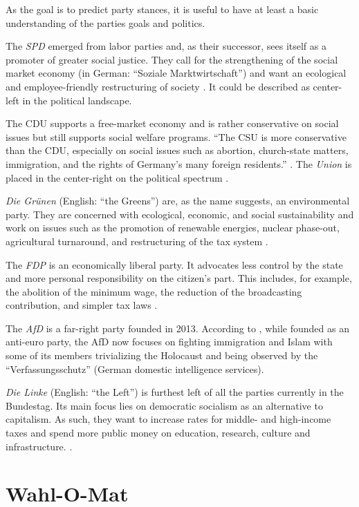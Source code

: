 As the goal is to predict party stances, it is useful to have at least a basic understanding of the parties goals and politics.

The \textit{SPD} emerged from labor parties and, as their successor, sees itself as a promoter of greater social justice. They call for the strengthening of the social market economy (in German: ``Soziale Marktwirtschaft'') and want an ecological and employee-friendly restructuring of society \citep{schubert2016politiklexikon}. It could be described as center-left in the political landscape.

The CDU supports a free-market economy and is rather conservative on social issues but still supports social welfare programs. ``The CSU is more conservative than the CDU, especially on social issues such as abortion, church-state matters, immigration, and the rights of Germany’s many foreign residents.'' \citep{conradt_2013}. The \textit{Union} is placed in the center-right on the political spectrum \citep{conradt_2021}.

\textit{Die Grünen} (English: ``the Greens'') are, as the name suggests, an environmental party. They are concerned with ecological, economic, and social sustainability and work on issues such as the promotion of renewable energies, nuclear phase-out, agricultural turnaround, and restructuring of the tax system \citep{decker_2021}.

The \textit{FDP} is an economically liberal party. It advocates less control by the state and more personal responsibility on the citizen's part. This includes, for example, the abolition of the minimum wage, the reduction of the broadcasting contribution, and simpler tax laws \citep{wiki_fdp}.

The \textit{AfD} is a far-right party founded in 2013. According to \citet{bbc_2020}, while founded as an anti-euro party, the AfD now focuses on fighting immigration and Islam with some of its members trivializing the Holocaust and being observed by the ``Verfassungsschutz'' (German domestic intelligence services).

\textit{Die Linke} (English: ``the Left'') is furthest left of all the parties currently in the Bundestag. Its main focus lies on democratic socialism as an alternative to capitalism. As such, they want to increase rates for middle- and high-income taxes and spend more public money on education, research, culture and infrastructure. \citep{wiki_linke}.

\section{Wahl-O-Mat}\label{wahlomat}

